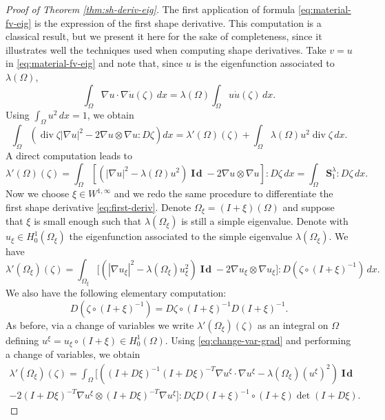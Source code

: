 \documentclass[11pt]{article}
\numberwithin{equation}{section}\newtheorem*{jepEnonce}{\jepEnonceTitle}\newenvironment{enonce*}[1]{\def\jepEnonceTitle{#1}\jepEnonce}{\endjepEnonce}\newtheorem*{conj*}{Conjecture}
\theoremstyle{plain}
\theoremstyle{definition}
\newcommand{\di}{\operatorname{div}}
\newcommand{\bo}[1]{{\boldsymbol#1}}
\newcommand{\Id}{\operatorname{{\bo I\!\bo d}}}
\begin{document}
\begin{proof}[Proof of Theorem \ref{thm:sh-deriv-eig}]
The first application of formula \eqref{eq:material-fv-eig} is the expression of the first shape derivative. This computation is a classical result, but we present it here for the sake of completeness, since it illustrates well the techniques used when computing shape derivatives. Take $v=u$ in \eqref{eq:material-fv-eig} and note that, since $u$ is the eigenfunction associated to $\lambda(\Omega)$,
\[
\int_\Omega \nabla u \cdot \nabla \dot u(\zeta) \, dx = \lambda(\Omega) \int_\Omega u \dot u(\zeta)\, dx.
\]
Using $\int_\Omega u^2\, dx=1$, we obtain
\[
\int_\Omega \left(\di \zeta |\nabla u|^2 -2 \nabla u\otimes \nabla u : D\zeta \right) dx=\lambda'(\Omega)(\zeta)+\int_\Omega \lambda(\Omega)u^2 \di \zeta\, dx .
\]
A direct computation leads to
\begin{equation}
\lambda'(\Omega)(\zeta) = \int_\Omega [(|\nabla u|^2-\lambda(\Omega) u^2)\Id-2\nabla u\otimes \nabla u] : D\zeta\, dx= \int_\Omega \bo S_1^\lambda : D\zeta\, dx .
\label{eq:first-deriv}
\end{equation}
Now we choose $\xi \in W^{1,\infty}$ and we redo the same procedure to differentiate the first shape derivative \eqref{eq:first-deriv}. Denote $\Omega_\xi = (I+\xi)(\Omega)$ and suppose that $\xi$ is small enough such that $\lambda(\Omega_\xi)$ is still a simple eigenvalue. Denote with $u_\xi \in H_0^1(\Omega_\xi)$ the eigenfunction associated to the simple eigenvalue $\lambda(\Omega_\xi)$. We have
\begin{equation}
\lambda'(\Omega_\xi)(\zeta) = \int_{\Omega_\xi} \big[(|\nabla u_\xi |^2-\lambda(\Omega_\xi) u_\xi^2)\Id-2\nabla u_\xi \otimes \nabla u_\xi \big] : D(\zeta\circ (I+\xi)^{-1})\, dx.
\label{eq:first-deriv-moved}
\end{equation}
We also have the following elementary computation:
\[
D(\zeta \circ (I+\xi)^{-1}) = D\zeta \circ (I+\xi)^{-1} D(I+\xi)^{-1}.
\]
As before, via a change of variables we write $\lambda'(\Omega_\xi)(\zeta)$ as an integral on $\Omega$ defining $u^\xi = u_\xi\circ (I+\xi) \in H_0^1(\Omega)$. Using \eqref{eq:change-var-grad} and performing a change of variables, we obtain
\vspace*{-5pt}
\begin{multline*} \lambda'(\Omega_\xi)(\zeta) = \int_\Omega \big[\left((I+D\xi)^{-1}(I+D\xi)^{-T} \nabla u^\xi\cdot \nabla u^\xi -\lambda(\Omega_\xi) (u^\xi)^2\right)\Id \\
-2 (I+D\xi)^{-T} \nabla u^\xi \otimes (I+D\xi)^{-T} \nabla u^\xi\big] : D\zeta D(I+\xi)^{-1}\circ (I+\xi) \det(I+D\xi).
\end{multline*}


\end{proof}
\end{document}
